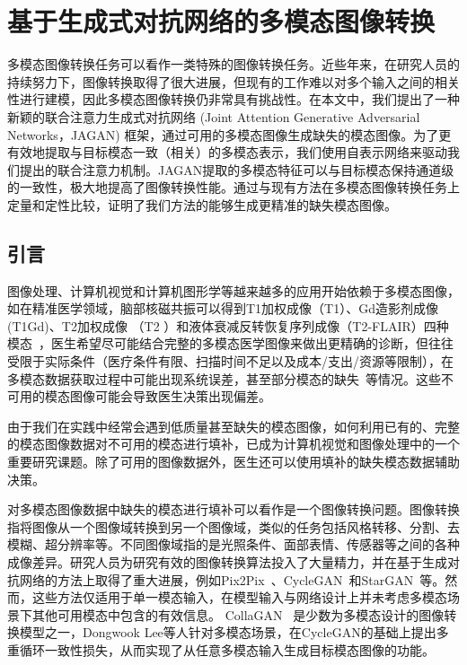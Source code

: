 \chapter{基于生成式对抗网络的多模态图像转换}

多模态图像转换任务可以看作一类特殊的图像转换任务。近些年来，在研究人员的持续努力下，图像转换取得了很大进展，但现有的工作难以对多个输入之间的相关性进行建模，因此多模态图像转换仍非常具有挑战性。在本文中，我们提出了一种新颖的联合注意力生成式对抗网络 (Joint Attention Generative Adversarial Networks，JAGAN) 框架，通过可用的多模态图像生成缺失的模态图像。为了更有效地提取与目标模态一致（相关）的多模态表示，我们使用自表示网络来驱动我们提出的联合注意力机制。JAGAN提取的多模态特征可以与目标模态保持通道级的一致性，极大地提高了图像转换性能。通过与现有方法在多模态图像转换任务上定量和定性比较，证明了我们方法的能够生成更精准的缺失模态图像。

\section{引言}

图像处理、计算机视觉和计算机图形学等越来越多的应用开始依赖于多模态图像，如在精准医学领域，脑部核磁共振可以得到T1加权成像（T1）、Gd造影剂成像(T1Gd)、T2加权成像 （T2 ）和液体衰减反转恢复序列成像（T2-FLAIR）四种模态~\cite{drevelegas2011imaging}，医生希望尽可能结合完整的多模态医学图像来做出更精确的诊断，但往往受限于实际条件（医疗条件有限、扫描时间不足以及成本/支出/资源等限制），在多模态数据获取过程中可能出现系统误差，甚至部分模态的缺失~\cite{tanenbaum2017synthetic}等情况。这些不可用的模态图像可能会导致医生决策出现偏差。

由于我们在实践中经常会遇到低质量甚至缺失的模态图像，如何利用已有的、完整的模态图像数据对不可用的模态进行填补，已成为计算机视觉和图像处理中的一个重要研究课题。除了可用的图像数据外，医生还可以使用填补的缺失模态数据辅助决策。

对多模态图像数据中缺失的模态进行填补可以看作是一个图像转换问题。图像转换指将图像从一个图像域转换到另一个图像域，类似的任务包括风格转移、分割、去模糊、超分辨率等。不同图像域指的是光照条件、面部表情、传感器等之间的各种成像差异。研究人员为研究有效的图像转换算法投入了大量精力，并在基于生成对抗网络的方法上取得了重大进展，例如Pix2Pix~\cite{pix2pix}、CycleGAN~\cite{cyclegan}和StarGAN~\cite{stargan}等。然而，这些方法仅适用于单一模态输入，在模型输入与网络设计上并未考虑多模态场景下其他可用模态中包含的有效信息。 CollaGAN~\cite{collagan} 是少数为多模态设计的图像转换模型之一，Dongwook Lee等人针对多模态场景，在CycleGAN的基础上提出多重循环一致性损失，从而实现了从任意多模态输入生成目标模态图像的功能。

